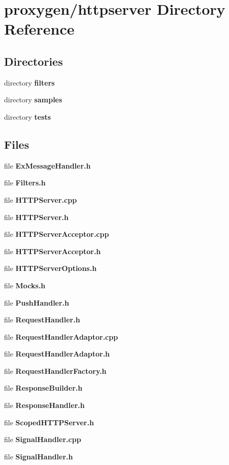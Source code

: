 \section{proxygen/httpserver Directory Reference}
\label{dir_da4c95d2391840887ede86fd57444fef}
\subsection*{Directories}
\begin{DoxyCompactItemize}
\item 
directory {\bf filters}
\item 
directory {\bf samples}
\item 
directory {\bf tests}
\end{DoxyCompactItemize}
\subsection*{Files}
\begin{DoxyCompactItemize}
\item 
file {\bf Ex\+Message\+Handler.\+h}
\item 
file {\bf Filters.\+h}
\item 
file {\bf H\+T\+T\+P\+Server.\+cpp}
\item 
file {\bf H\+T\+T\+P\+Server.\+h}
\item 
file {\bf H\+T\+T\+P\+Server\+Acceptor.\+cpp}
\item 
file {\bf H\+T\+T\+P\+Server\+Acceptor.\+h}
\item 
file {\bf H\+T\+T\+P\+Server\+Options.\+h}
\item 
file {\bf Mocks.\+h}
\item 
file {\bf Push\+Handler.\+h}
\item 
file {\bf Request\+Handler.\+h}
\item 
file {\bf Request\+Handler\+Adaptor.\+cpp}
\item 
file {\bf Request\+Handler\+Adaptor.\+h}
\item 
file {\bf Request\+Handler\+Factory.\+h}
\item 
file {\bf Response\+Builder.\+h}
\item 
file {\bf Response\+Handler.\+h}
\item 
file {\bf Scoped\+H\+T\+T\+P\+Server.\+h}
\item 
file {\bf Signal\+Handler.\+cpp}
\item 
file {\bf Signal\+Handler.\+h}
\end{DoxyCompactItemize}
